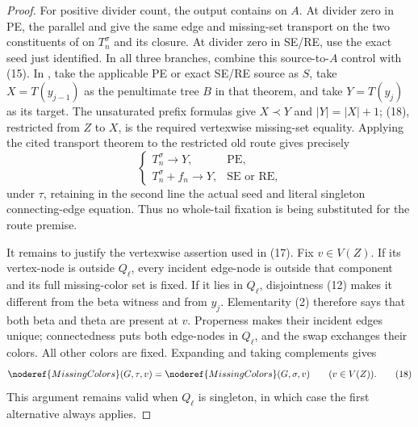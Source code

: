 \begin{proof}
{For positive divider count, the  output contains
 on $A$.  At divider zero in PE, the
parallel  and
 give the same edge and
missing-set transport on the two  constituents
of  on $T_n^\sigma$ and its closure.  At divider zero
in SE/RE, use the exact seed just identified.  In all three branches,
combine this source-to-$A$ control with (15).  In
, take the
applicable PE or exact SE/RE source as $S$, take $X=T(y_{j-1})$ as the
penultimate tree $B$ in that theorem, and take $Y=T(y_j)$ as its target.
The unsaturated prefix formulas give $X\prec Y$ and $|Y|=|X|+1$;
(18), restricted from $Z$ to $X$, is the required vertexwise
missing-set equality.  Applying the cited transport theorem to the
restricted old route gives precisely
\[
 \begin{cases}
 T_n^\sigma\longrightarrow Y,&\text{PE},\\
 T_n^\sigma+f_n\longrightarrow Y,&\text{SE or RE},
 \end{cases}                                                   \tag{17}
\]
under $\tau$, retaining in the second line the actual seed and literal
singleton connecting-edge equation.  Thus no whole-tail fixation is
being substituted for the route premise.

It remains to justify the vertexwise assertion used in (17).  Fix
$v\in V(Z)$.  If its vertex-node is outside $Q_\ell$, every incident
edge-node is outside that component and its full missing-color set is
fixed.  If it lies in $Q_\ell$, disjointness (12) makes it different
from the beta witness and from $y_j$.  Elementarity (2) therefore says
that both beta and theta are present at $v$.  Properness makes their
incident edges unique; connectedness puts both edge-nodes in
$Q_\ell$, and the swap exchanges their colors.  All other colors are
fixed.  Expanding  and taking complements gives
\[
 \noderef{MissingColors}(G,\tau,v)
   =\noderef{MissingColors}(G,\sigma,v)\qquad(v\in V(Z)).       \tag{18}
\]
This argument remains valid when $Q_\ell$ is singleton, in which case
the first alternative always applies.

}
\end{proof}
